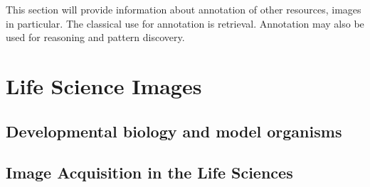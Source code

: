 This section will provide information about annotation of other
resources, images in particular. The classical use for annotation is
retrieval. Annotation may also be used for reasoning and pattern
discovery.


\section{Life Science Images}



\subsection{Developmental biology and model organisms}



\subsection{Image Acquisition in the Life Sciences}


